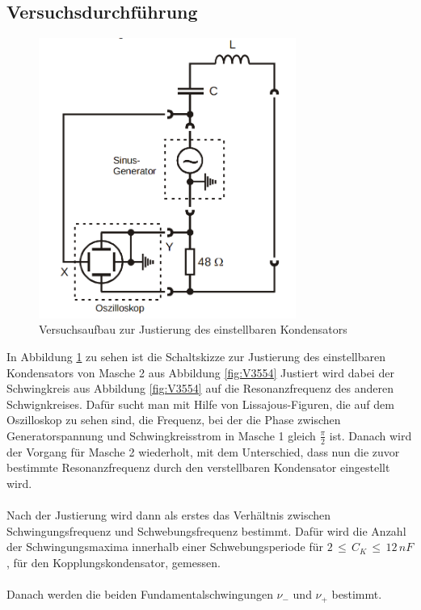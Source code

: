 \documentclass[
  bibliography=totoc,     %
  captions=tableheading,  %
  titlepage=firstiscover, %
]{scrartcl}
\begin{document}
\subsection{Versuchsdurchführung}
\label{sec:versuchsdurchführung}
\begin{figure}[htb]
  \centering
  \includegraphics[width=0.75\textwidth]{V3553.png}
  \caption{Versuchsaufbau zur Justierung des einstellbaren Kondensators}
  \label{fig:V3553}
\end{figure}
In Abbildung \ref{fig:V3553} zu sehen ist die Schaltskizze zur Justierung
des einstellbaren Kondensators von Masche 2 aus Abbildung \ref{fig:V3554}
Justiert wird dabei der Schwingkreis aus Abbildung \ref{fig:V3554} auf die
Resonanzfrequenz des anderen Schwignkreises. Dafür sucht man mit Hilfe von
Lissajous-Figuren, die auf dem Oszilloskop zu sehen sind, die Frequenz, bei der
die Phase zwischen Generatorspannung und Schwingkreisstrom in Masche 1
gleich $\frac{\pi}{2}$ ist. Danach wird der Vorgang für Masche 2 wiederholt, mit
dem Unterschied, dass nun die zuvor bestimmte Resonanzfrequenz durch den
verstellbaren Kondensator eingestellt wird. \\
\\
Nach der Justierung wird dann als erstes das Verhältnis zwischen Schwingungsfrequenz
und Schwebungsfrequenz bestimmt. Dafür wird die Anzahl der Schwingungsmaxima
innerhalb einer Schwebungsperiode für $2\,\leq\,C_K\,\leq\,12\,nF$, für den
Kopplungskondensator, gemessen. \\
\\
Danach werden die beiden Fundamentalschwingungen $\nu_-$ und $\nu_+$ bestimmt.
\end{document}
